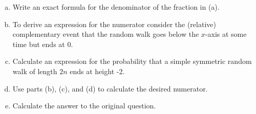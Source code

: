 \documentclass{article}
\begin{document}
\begin{enumerate}[(1)]
\begin{enumerate}[(a)]
			\item Write an exact formula for the denominator of the fraction in (a).

			\item To derive an expression for the numerator consider the (relative) complementary event that the random walk goes below the $x$-axis at some time but ends at 0.

			\item Calculate an expression for the probability that a simple symmetric random walk of length $2n$ ends at height -2.

			\item Use parts (b), (c), and (d) to calculate the desired numerator.

			\item Calculate the answer to the original question.
				
		\end{enumerate}
		
\end{enumerate}
\end{document}
